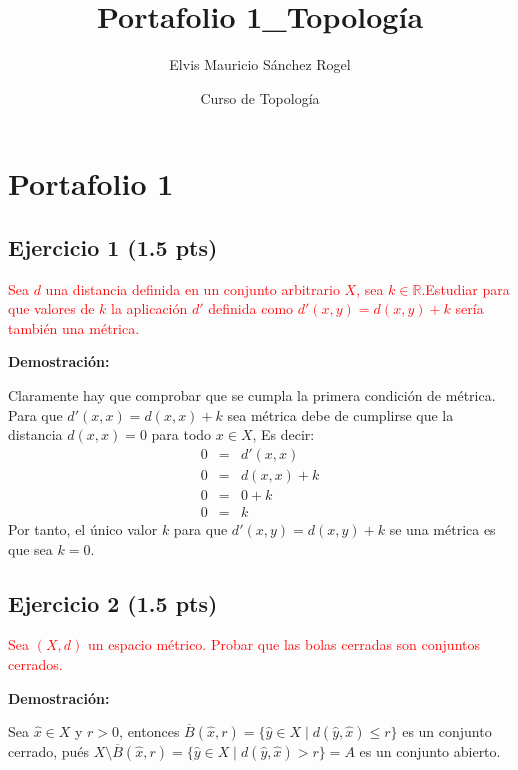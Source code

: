 \documentclass[
]{article}
\title{Portafolio 1\_Topología}
\author{Elvis Mauricio Sánchez Rogel}
\date{Curso de Topología}
\begin{document}
\maketitle

{
\hypersetup{linkcolor=blue}
\setcounter{tocdepth}{2}
\tableofcontents
}
\hypertarget{portafolio-1}{%
\section{Portafolio 1}\label{portafolio-1}}

\hypertarget{ejercicio-1-1.5-pts}{%
\subsection{Ejercicio 1 (1.5 pts)}\label{ejercicio-1-1.5-pts}}

\textcolor{red}{Sea $d$ una distancia definida en un conjunto arbitrario $X$, sea $k \in \mathbb{R}$.Estudiar para que valores de $k$ la aplicación $d'$ definida como $d'(x,y)=d(x,y)+k$ sería también una métrica.}

\textbf{Demostración:}

Claramente hay que comprobar que se cumpla la primera condición de
métrica. Para que \(d'(x,x)=d(x,x)+k\) sea métrica debe de cumplirse que
la distancia \(d(x,x)=0\) para todo \(x \in X\), Es decir:
\begin{eqnarray*}
  0 & = & d'(x,x) \\
  0 & = & d(x,x)+k  \\
  0 & = & 0 + k \\
  0 & = & k 
\end{eqnarray*} Por tanto, el único valor \(k\) para que
\(d'(x,y) =d(x,y)+k\) se una métrica es que sea \(k=0\).

\hypertarget{ejercicio-2-1.5-pts}{%
\subsection{Ejercicio 2 (1.5 pts)}\label{ejercicio-2-1.5-pts}}

\textcolor{red}{ Sea $(X,d)$ un espacio métrico. Probar que las bolas cerradas son conjuntos cerrados.}

\textbf{Demostración:}

Sea \(\hat{x} \in X\) y \(r>0\), entonces
\(\overline{B}(\hat{x},r)=\{ \hat{y} \in X \mid d(\hat{y},\hat{x}) \leq r\}\)
es un conjunto cerrado, pués
\(X \setminus \overline B(\hat{x},r) = \{ \hat{y} \in X \mid d(\hat{y},\hat{x}) > r\}= A\)
es un conjunto abierto.
\end{document}

